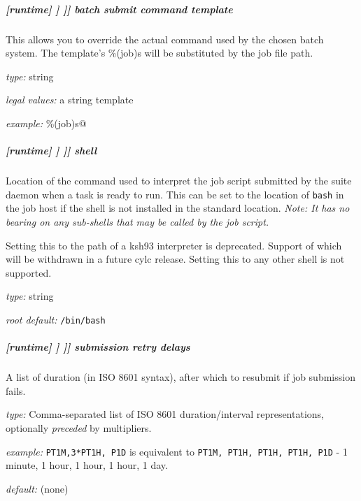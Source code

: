 \subparagraph[batch submit command template]{[runtime] \textrightarrow [[\_\_NAME\_\_]] \textrightarrow [[[job]]] \textrightarrow batch submit command template}

This allows you to override the actual command used by the chosen batch
system. The template's \%(job)s will be substituted by the
job file path.

\begin{myitemize}
\item {\em type:} string
\item {\em legal values:} a string template
\item {\em example:} \lstinline@llsubmit \%(job)s@
\end{myitemize}

\subparagraph[shell]{[runtime] \textrightarrow [[\_\_NAME\_\_]] \textrightarrow [[[job]]] \textrightarrow shell}
\label{JobSubShell}

Location of the command used to interpret the job script submitted by the
suite daemon when a task is ready to run. This can be set to the location of
\lstinline=bash= in the job host if the shell is not installed in the standard
location.
{\em Note: It has no bearing on any sub-shells that may be called by the job script.}

Setting this to the path of a ksh93 interpreter is deprecated. Support of which
will be withdrawn in a future cylc release. Setting this to any other shell is
not supported.

\begin{myitemize}
\item {\em type:} string
\item {\em root default:} \lstinline=/bin/bash=
\end{myitemize}

\subparagraph[submission retry delays]{[runtime] \textrightarrow [[\_\_NAME\_\_]] \textrightarrow [[[job]]] \textrightarrow submission retry delays}
\label{JobSubRefRetries}

A list of duration (in ISO 8601 syntax), after which to resubmit if job
submission fails.
\begin{myitemize}
    \item {\em type:} Comma-separated list of ISO 8601 duration/interval
        representations, optionally {\em preceded} by multipliers.
    \item {\em example:} \lstinline=PT1M,3*PT1H, P1D= is equivalent to
    \lstinline=PT1M, PT1H, PT1H, PT1H, P1D= - 1 minute, 1 hour, 1 hour, 1
    hour, 1 day.
    \item {\em default:} (none)
\end{myitemize}

